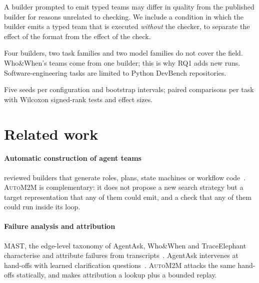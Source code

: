 \documentclass[10pt,a4paper]{article}
\newcommand{\auto}{\textsc{AutoM2M}}
\newcommand{\what}[1]{\par\smallskip\noindent{\sffamily\bfseries\color{accent}#1}\quad}
\begin{document}
\what{Internal.} A builder prompted to emit typed teams may differ in
quality from the published builder for reasons unrelated to checking. We
include a condition in which the builder emits a typed team that is
executed \emph{without} the checker, to separate the effect of the format
from the effect of the check.

\what{External.} Four builders, two task families and two model families
do not cover the field. Who\&When's teams come from one builder; this is
why RQ1 adds new runs. Software-engineering tasks are limited to Python
DevBench repositories.

\what{Conclusion.} Five seeds per configuration and bootstrap intervals;
paired comparisons per task with Wilcoxon signed-rank tests and effect
sizes.

\section{Related work}\label{sec:related}

\paragraph{Automatic construction of agent teams} 
reviewed builders that generate roles, plans, state machines or workflow
code~\cite{song2024captain,chen2024autoagents,chen2024agentverse,liu2024dylan,yuan2025evoagent,zhang2025metaagent,ke2025maszero,hu2025adas,zhang2025aflow,zhang2025maas,zhuge2024gptswarm,qian2025macnet,he2026tpgo}.
\auto{} is complementary: it does not propose a new search strategy but a
target representation that any of them could emit, and a check that any of
them could run inside its loop.

\paragraph{Failure analysis and attribution} MAST, the edge-level
taxonomy of AgentAsk, Who\&When and TraceElephant characterise and
attribute failures from
transcripts~\cite{cemri2025mast,lin2026agentask,zhang2025whowhen,chen2026traceelephant}.
AgentAsk intervenes at hand-offs with learned clarification
questions~\cite{lin2026agentask}. \auto{} attacks the same hand-offs
statically, and makes attribution a lookup plus a bounded replay.
\end{document}
